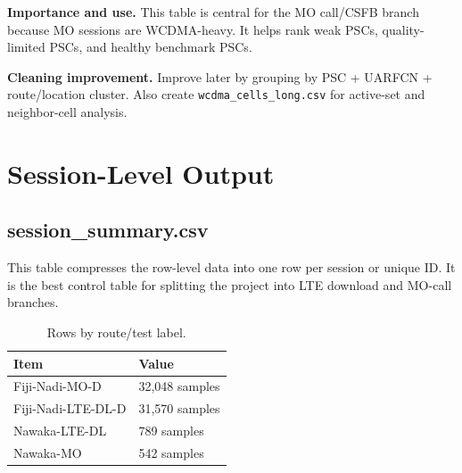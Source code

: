\documentclass[12pt,a4paper]{article}
\begin{document}
\textbf{Importance and use.} This table is central for the MO call/CSFB branch because MO sessions are WCDMA-heavy. It helps rank weak PSCs, quality-limited PSCs, and healthy benchmark PSCs.

\textbf{Cleaning improvement.} Improve later by grouping by PSC + UARFCN + route/location cluster. Also create \texttt{wcdma\_cells\_long.csv} for active-set and neighbor-cell analysis.


\section{Session-Level Output}

\subsection{session\_summary.csv}
This table compresses the row-level data into one row per session or unique ID. It is the best control table for splitting the project into LTE download and MO-call branches.


\begin{table}[H]
\centering
\begin{tabularx}{0.94\textwidth}{P{5.2cm}Y}
\toprule
\textbf{Item} & \textbf{Value} \\
\midrule
Fiji-Nadi-MO-D & 32,048 samples \\
Fiji-Nadi-LTE-DL-D & 31,570 samples \\
Nawaka-LTE-DL & 789 samples \\
Nawaka-MO & 542 samples \\
\bottomrule
\end{tabularx}
\caption{Rows by route/test label.}
\end{table}
\end{document}
